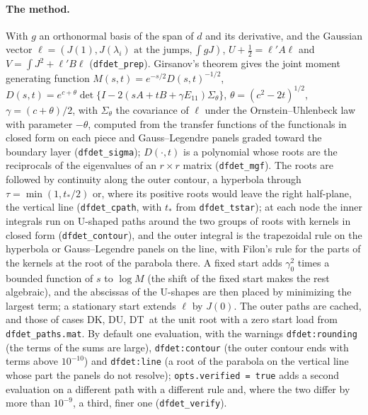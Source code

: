 \documentclass[11pt]{article}
\newcommand{\code}[1]{\texttt{#1}}
\newcommand{\Fk}{\textsf{DK}}
\newcommand{\Fu}{\textsf{DU}}
\newcommand{\Ft}{\textsf{DT}}
\begin{document}
\paragraph{The method.}  With $g$ an orthonormal basis of the span of $d$ and its derivative, and the Gaussian vector $\ell=(J(1),J(\lambda_i)\text{ at the jumps},\int gJ)$, $U+\frac12=\ell'A\ell$ and $V=\int J^2+\ell'B\ell$ (\code{dfdet\_prep}).  Girsanov's theorem gives the joint moment generating function $M(s,t)=e^{-s/2}D(s,t)^{-1/2}$, $D(s,t)=e^{c+\theta}\det\{I-2(sA+tB+\gamma E_{11})\Sigma_\theta\}$, $\theta=(c^2-2t)^{1/2}$, $\gamma=(c+\theta)/2$, with $\Sigma_\theta$ the covariance of $\ell$ under the Ornstein--Uhlenbeck law with parameter $-\theta$, computed from the transfer functions of the functionals in closed form on each piece and Gauss--Legendre panels graded toward the boundary layer (\code{dfdet\_sigma}); $D(\cdot,t)$ is a polynomial whose roots are the reciprocals of the eigenvalues of an $r\times r$ matrix (\code{dfdet\_mgf}).  The roots are followed by continuity along the outer contour, a hyperbola through $\tau=\min(1,t_*/2)$ or, where its positive roots would leave the right half-plane, the vertical line (\code{dfdet\_cpath}, with $t_*$ from \code{dfdet\_tstar}); at each node the inner integrals run on U-shaped paths around the two groups of roots with kernels in closed form (\code{dfdet\_contour}), and the outer integral is the trapezoidal rule on the hyperbola or Gauss--Legendre panels on the line, with Filon's rule for the parts of the kernels at the root of the parabola there.  A fixed start adds $\gamma_0^2$ times a bounded function of $s$ to $\log M$ (the shift of the fixed start makes the rest algebraic), and the abscissas of the U-shapes are then placed by minimizing the largest term; a stationary start extends $\ell$ by $J(0)$.  The outer paths are cached, and those of cases \Fk, \Fu, \Ft\ at the unit root with a zero start load from \code{dfdet\_paths.mat}.  By default one evaluation, with the warnings \code{dfdet:rounding} (the terms of the sums are large), \code{dfdet:contour} (the outer contour ends with terms above $10^{-10}$) and \code{dfdet:line} (a root of the parabola on the vertical line whose part the panels do not resolve); \code{opts.verified = true} adds a second evaluation on a different path with a different rule and, where the two differ by more than $10^{-9}$, a third, finer one (\code{dfdet\_verify}).
\end{document}
